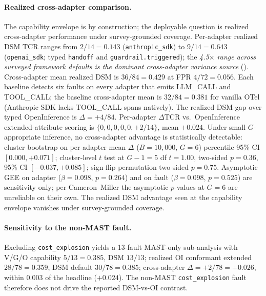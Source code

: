\documentclass[a4paper,UKenglish,cleveref,autoref,thm-restate]{lipics-v2021}
\begin{document}
\paragraph*{Realized cross-adapter comparison.}
The capability envelope is by construction; the deployable question
is realized cross-adapter performance under survey-grounded coverage.
Per-adapter realized DSM TCR ranges from $2/14 = 0.143$
(\texttt{anthropic\_sdk}) to $9/14 = 0.643$ (\texttt{openai\_sdk};
typed \texttt{handoff} and \texttt{guardrail.triggered}); the
\emph{4.5$\times$ range across surveyed framework defaults is the
dominant cross-adapter variance source} ().
Cross-adapter mean realized DSM is $36/84 = 0.429$ at FPR
$4/72 = 0.056$. Each baseline detects six faults on every adapter
that emits LLM\_CALL and TOOL\_CALL; the baseline cross-adapter mean
is $32/84 = 0.381$ for vanilla OTel (Anthropic SDK lacks TOOL\_CALL
spans natively). The realized DSM gap over typed OpenInference is
$\Delta = +4/84$. Per-adapter $\Delta\text{TCR}$ vs.\ OpenInference
extended-attribute scoring is $\{0, 0, 0, 0, 0, +2/14\}$, mean
$+0.024$. Under small-$G$-appropriate inference, no
cross-adapter advantage is statistically detectable: cluster bootstrap
on per-adapter mean $\Delta$ ($B = 10{,}000$, $G = 6$) percentile
95\% CI $[0.000, +0.071]$; cluster-level $t$ test at $G - 1 = 5$ df $t = 1.00$,
two-sided $p = 0.36$, 95\% CI $[-0.037, +0.085]$; sign-flip
permutation two-sided $p = 0.75$. Asymptotic GEE on adapter
($\beta = 0.098$, $p = 0.264$) and on fault ($\beta = 0.098$,
$p = 0.525$) are sensitivity only; per Cameron--Miller
\cite{cameron2015} the asymptotic $p$-values at $G = 6$ are
unreliable on their own. The realized DSM advantage seen at the
capability envelope vanishes under survey-grounded coverage.

\paragraph*{Sensitivity to the non-MAST fault.}
Excluding \texttt{cost\_explosion} yields a 13-fault MAST-only
sub-analysis with V/G/O capability $5/13 = 0.385$, DSM $13/13$;
realized OI conformant extended $28/78 = 0.359$, DSM default
$30/78 = 0.385$; cross-adapter $\Delta = +2/78 = +0.026$, within
$0.003$ of the headline ($+0.024$). The non-MAST
\texttt{cost\_explosion} fault therefore does not drive the
reported DSM-vs-OI contrast.
\end{document}
